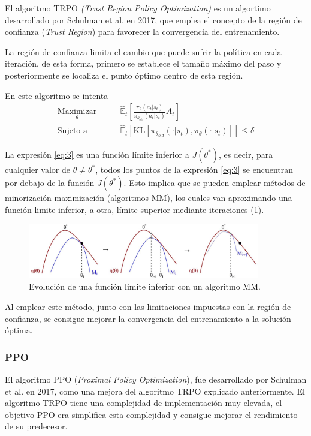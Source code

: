 El algoritmo TRPO \textit{(Trust Region Policy Optimization)} es un algortimo desarrollado por Schulman et al.  en 2017, que emplea el concepto de la región de confianza (\textit{Trust Region}) para favorecer la convergencia del entrenamiento.

La región de confianza limita el cambio que puede sufrir la política en cada iteración, de esta forma, primero se establece el tamaño máximo del paso y posteriormente se localiza el punto óptimo dentro de esta región.

En este algoritmo se intenta
\begin{align}\label{eq:3}
	\underset{\theta}{\text{Maximizar}}\qquad&{\mathbb{\hat E}_t} \left[ \frac{\pi_\theta (a_t|s_t)}{\pi_{\theta_{old}} (a_t|s_t)} \hat{A}_t\right]\\\label{eq:4}
	\text{Sujeto a}\qquad& {\mathbb{\hat E}_t} \left[ \text{KL}[\pi_{\theta_{old}}(\cdot|s_t),\pi_{\theta}(\cdot|s_t)]\right] \le \delta
\end{align}

La expresión \ref{eq:3} es una función límite inferior a $J(\theta^*)$, es decir, para cualquier valor de $\theta \neq \theta^*$, todos los puntos de la expresión \ref{eq:3} se encuentran por debajo de la función $J(\theta^*)$. Esto implica que se pueden emplear métodos de minorización-maximización (algoritmos MM), los cuales van aproximando una función limite inferior, a otra, límite superior mediante iteraciones (\cref{MM_fig}).

\begin{figure}[htb!]
	\centering
	\includegraphics[width=0.9\textwidth]{background/MM}
	\caption{Evolución de una función limite inferior con un algoritmo MM.}
	\label{MM_fig}
\end{figure}

Al emplear este método, junto con las limitaciones impuestas con la región de confianza, se consigue mejorar la convergencia del entrenamiento a la solución óptima.

\subsubsection{PPO}
El algoritmo PPO (\textit{Proximal Policy Optimization}), fue desarrollado por Schulman et al.  en 2017, como una mejora del algoritmo TRPO explicado anteriormente. El algoritmo TRPO tiene una complejidad de implementación muy elevada, el objetivo PPO era simplifica esta complejidad y consigue mejorar el rendimiento de su predecesor.

